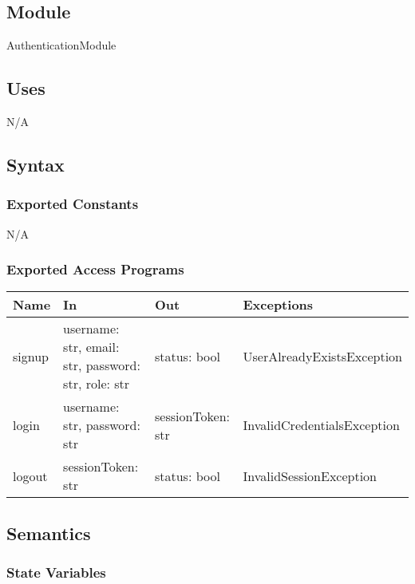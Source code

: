 \documentclass[12pt, titlepage]{article}
\begin{document}
\subsection{Module}

AuthenticationModule

\subsection{Uses}

N/A

\subsection{Syntax}

\subsubsection{Exported Constants}

N/A

\subsubsection{Exported Access Programs}

\begin{center}
\begin{tabular}{p{3cm} p{4cm} p{4cm} p{5cm}}
\hline
\textbf{Name} & \textbf{In} & \textbf{Out} & \textbf{Exceptions} \\
\hline
signup & \raggedright\arraybackslash username: str, email: str, password: str, role: str & \raggedright\arraybackslash status: bool & \raggedright\arraybackslash UserAlreadyExistsException \\
\hline
login & \raggedright\arraybackslash username: str, password: str & \raggedright\arraybackslash sessionToken: str & \raggedright\arraybackslash InvalidCredentialsException \\
\hline
logout & \raggedright\arraybackslash sessionToken: str & \raggedright\arraybackslash status: bool & \raggedright\arraybackslash InvalidSessionException \\
\hline
\end{tabular}
\end{center}


\subsection{Semantics}

\subsubsection{State Variables}
\end{document}
